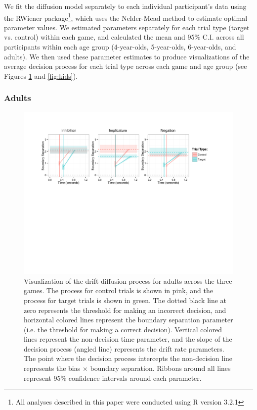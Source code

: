 \documentclass[10pt,letterpaper]{article}
\begin{document}
We fit the diffusion model separately to each individual participant's data using the RWiener package\footnote{All analyses described in this paper were conducted using R version 3.2.1}, which uses the Nelder-Mead method to estimate optimal parameter values.  We estimated parameters separately for each trial type (target vs. control) within each game, and calculated the mean and 95\% C.I. across all participants within each age group (4-year-olds, 5-year-olds, 6-year-olds, and adults).  We then used these parameter estimates to produce visualizations of the average decision process for each trial type across each game and age group (see Figures \ref{fig:adults} and \ref{fig:kids}).  

\subsubsection{Adults}

\begin{figure}
\begin{center} 
\includegraphics[width=6in]{figures/adult_vis.pdf}
\caption{\label{fig:adults} Visualization of the drift diffusion process for adults across the three games.  The process for control trials is shown in pink, and the process for target trials is shown in green.  The dotted black line at zero represents the threshold for making an incorrect decision, and horizontal colored lines represent the boundary separation parameter (i.e. the threshold for making a correct decision).  Vertical colored lines represent the non-decision time parameter, and the slope of the decision process (angled line) represents the drift rate parameters.  The point where the decision process intercepts the non-decision line represents the bias $\times$ boundary separation.  Ribbons around all lines represent 95\% confidence intervals around each parameter.}
\end{center} 
\end{figure}
\end{document}
